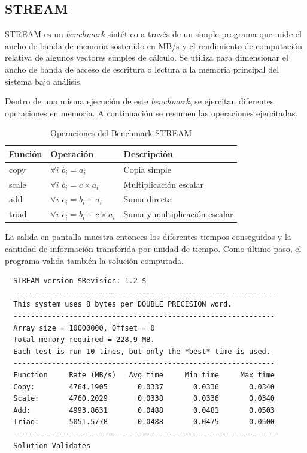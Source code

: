\documentclass[a4paper]{report}
\begin{document}
\subsection{STREAM}

STREAM \cite{stream} es un {\it benchmark} sint\'etico a trav\'es de un simple
programa que mide el ancho de banda de memoria sostenido en MB/s y el
rendimiento de computaci\'on relativa de algunos vectores simples de c\'alculo.
Se utiliza para dimensionar el ancho de banda de acceso de escritura o lectura
a la memoria principal del sistema bajo an\'alisis.

\bigskip

Dentro de una misma ejecuci\'on de este {\it benchmark}, se ejercitan diferentes
operaciones en memoria. A continuaci\'on se resumen las operaciones ejercitadas.

\begin{table}[H]
\caption{Operaciones del Benchmark STREAM}
  \begin{center}
    \begin{tabular}{|l|l|l|}\hline
      {\bf Funci\'on} & {\bf Operaci\'on} & {\bf Descripci\'on} \\ \hline
      copy & $ \forall i $ $ b_{i} = a_{i} $ & Copia simple \\ \hline
      scale & $ \forall i $ $ b_{i} = c \times a_{i} $ & Multiplicaci\'on escalar \\ \hline
      add & $ \forall i $ $ c_{i} = b_{i} + a_{i} $ & Suma directa \\ \hline
      triad & $ \forall i $ $ c_{i} = b_{i} + c \times a_{i} $ & Suma y multiplicaci\'on escalar \\ \hline
    \end{tabular}
    
   \end{center}
 \label{stream}
\end{table}

La salida en pantalla muestra entonces los diferentes tiempos conseguidos y la cantidad de informaci\'on transferida por unidad de tiempo.
Como \'ultimo paso, el programa valida tambi\'en la soluci\'on computada.

{\small
\begin{verbatim}
  STREAM version $Revision: 1.2 $
  -------------------------------------------------------------
  This system uses 8 bytes per DOUBLE PRECISION word.
  -------------------------------------------------------------
  Array size = 10000000, Offset = 0
  Total memory required = 228.9 MB.
  Each test is run 10 times, but only the *best* time is used.
  -------------------------------------------------------------
  Function     Rate (MB/s)   Avg time     Min time     Max time
  Copy:        4764.1905       0.0337       0.0336       0.0340
  Scale:       4760.2029       0.0338       0.0336       0.0340
  Add:         4993.8631       0.0488       0.0481       0.0503
  Triad:       5051.5778       0.0488       0.0475       0.0500
  -------------------------------------------------------------
  Solution Validates
\end{verbatim}
}
\end{document}
